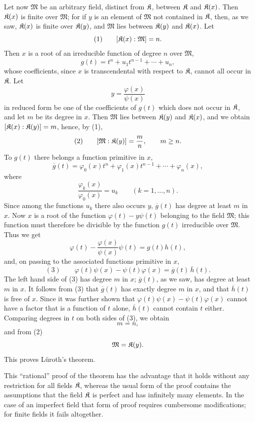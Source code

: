 Let now \(\mathfrak M\) be an arbitrary field, distinct from \(\mathfrak K\), between \(\mathfrak K\) and \(\mathfrak K(x)\). Then \(\mathfrak K(x)\) is finite over \(\mathfrak M\); for if \(y\) is an element of \(\mathfrak M\) not contained in \(\mathfrak K\), then, as we saw, \(\mathfrak K(x)\) is finite over \(\mathfrak K(y)\), and \(\mathfrak M\) lies between \(\mathfrak K(y)\) and \(\mathfrak K(x)\). Let
\[
(1)\qquad [\mathfrak K(x):\mathfrak M]=n.
\]
Then \(x\) is a root of an irreducible function of degree \(n\) over \(\mathfrak M\),
\[
g(t)=t^n+u_1t^{n-1}+\cdots+u_n,
\]
whose coefficients, since \(x\) is transcendental with respect to \(\mathfrak K\), cannot all occur in \(\mathfrak K\). Let
\[
y=\frac{\varphi(x)}{\psi(x)}
\]
in reduced form be one of the coefficients of \(g(t)\) which does not occur in \(\mathfrak K\), and let \(m\) be its degree in \(x\). Then \(\mathfrak M\) lies between \(\mathfrak K(y)\) and \(\mathfrak K(x)\), and we obtain \([\mathfrak K(x):\mathfrak K(y)]=m\), hence, by (1),
\[
(2)\qquad [\mathfrak M:\mathfrak K(y)]=\frac{m}{n},\qquad m\geq n.
\]
To \(g(t)\) there belongs a function primitive in \(x\),
\[
\overline g(t)=\varphi_0(x)t^n+\varphi_1(x)t^{n-1}+\cdots+\varphi_n(x),
\]
where
\[
\frac{\varphi_k(x)}{\varphi_0(x)}=u_k\qquad(k=1,\ldots,n).
\]
Since among the functions \(u_k\) there also occurs \(y\), \(\overline g(t)\) has degree at least \(m\) in \(x\). Now \(x\) is a root of the function \(\varphi(t)-y\psi(t)\) belonging to the field \(\mathfrak M\); this function must therefore be divisible by the function \(g(t)\) irreducible over \(\mathfrak M\). Thus we get
\[
\varphi(t)-\frac{\varphi(x)}{\psi(x)}\psi(t)=g(t)h(t),
\]
and, on passing to the associated functions primitive in \(x\),
\[
(3)\qquad \varphi(t)\psi(x)-\psi(t)\varphi(x)=\overline g(t)\,\overline h(t).
\]
The left hand side of (3) has degree \(m\) in \(x\); \(\overline g(t)\), as we saw, has degree at least \(m\) in \(x\). It follows from (3) that \(\overline g(t)\) has exactly degree \(m\) in \(x\), and that \(\overline h(t)\) is free of \(x\). Since it was further shown that \(\varphi(t)\psi(x)-\psi(t)\varphi(x)\) cannot have a factor that is a function of \(t\) alone, \(\overline h(t)\) cannot contain \(t\) either. Comparing degrees in \(t\) on both sides of (3), we obtain
\[
m=n,
\]
and from (2)
\[
\mathfrak M=\mathfrak K(y).
\]
This proves Lüroth's theorem.

This ``rational'' proof of the theorem has the advantage that it holds without any restriction for all fields \(\mathfrak K\), whereas the usual form of the proof contains the assumptions that the field \(\mathfrak K\) is perfect and has infinitely many elements. In the case of an imperfect field that form of proof requires cumbersome modifications; for finite fields it fails altogether.


